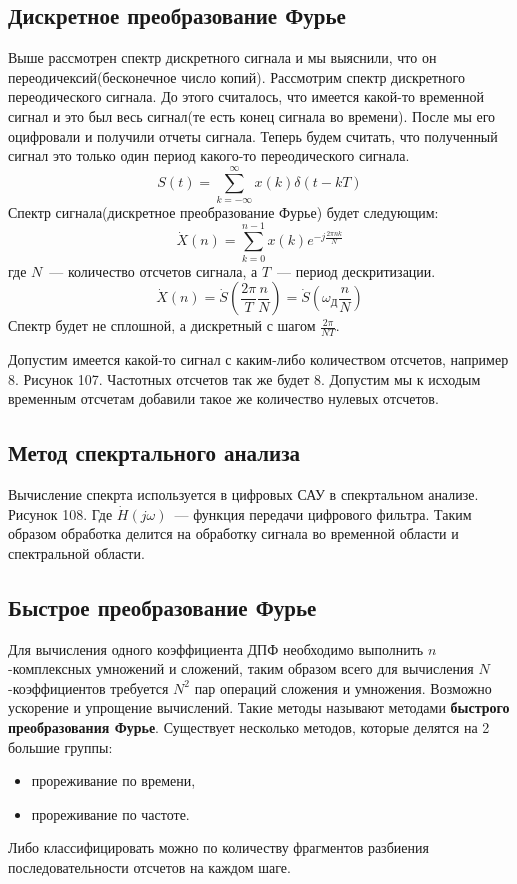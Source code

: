 \subsection{Дискретное преобразование Фурье}
Выше рассмотрен спектр дискретного сигнала и мы выяснили, что он переодичексий(бесконечное число копий). Рассмотрим спектр дискретного переодического сигнала. До этого считалось, что имеется какой-то временной сигнал и это был весь сигнал(те есть конец сигнала во времени). После мы его оцифровали и получили отчеты сигнала. Теперь будем считать, что полученный сигнал это только один период какого-то переодического сигнала.
$$
	S(t)=\sum^{\infty}_{k=-\infty}x(k)\delta(t-kT)
$$
Спектр сигнала(дискретное преобразование Фурье) будет следующим:
$$
	\dot{X}(n)=\sum^{n-1}_{k=0}x(k)e^{-j\frac{2\pi{}nk}{N}}
$$
где $N$~--- количество отсчетов сигнала, а $T$~--- период дескритизации.
$$
	\dot{X}(n)=\dot{S}(\frac{2\pi}{T}\frac{n}{N})=\dot{S}(\omega_{\text{Д}}\frac{n}{N})
$$
Спектр будет не сплошной, а дискретный с шагом $\frac{2\pi}{NT}$.

Допустим имеется какой-то сигнал с каким-либо количеством отсчетов, например 8. Рисунок 107. Частотных отсчетов так же будет 8. Допустим мы к исходым временным отсчетам добавили такое же количество нулевых отсчетов.

\subsection{Метод спекртального анализа}
Вычисление спекрта используется в цифровых САУ в спекртальном анализе. Рисунок 108. Где $\dot{H}(j\omega)$~--- функция передачи цифрового фильтра. Таким образом обработка делится на обработку сигнала во временной области и спектральной области.

\subsection{Быстрое преобразование Фурье}
Для вычисления одного коэффициента ДПФ необходимо выполнить $n$-комплексных умножений и сложений, таким образом всего для вычисления $N$-коэффициентов требуется $N^2$ пар операций сложения и умножения. Возможно ускорение и упрощение вычислений. Такие методы называют методами \textbf{быстрого преобразования Фурье}. Существует несколько методов, которые делятся на 2 большие группы:
\begin{itemize}
	\item прореживание по времени,
	\item прореживание по частоте.
\end{itemize}
Либо классифицировать можно по количеству фрагментов разбиения последовательности отсчетов на каждом шаге.

